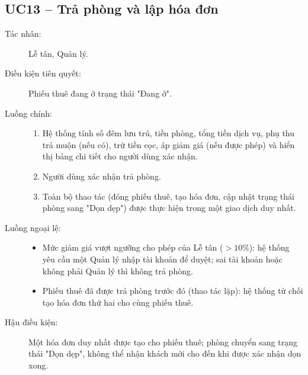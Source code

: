 \documentclass[14pt]{report}
\begin{document}
\subsection{UC13 -- Trả phòng và lập hóa đơn}
\begin{description}
  \item[Tác nhân:] Lễ tân, Quản lý.
  \item[Điều kiện tiên quyết:] Phiếu thuê đang ở trạng thái "Đang ở".
  \item[Luồng chính:]
  \begin{enumerate}
    \item Hệ thống tính số đêm lưu trú, tiền phòng, tổng tiền dịch vụ, phụ thu trả muộn (nếu có), trừ tiền cọc, áp giảm giá (nếu được phép) và hiển thị bảng chi tiết cho người dùng xác nhận.
    \item Người dùng xác nhận trả phòng.
    \item Toàn bộ thao tác (đóng phiếu thuê, tạo hóa đơn, cập nhật trạng thái phòng sang "Dọn dẹp") được thực hiện trong một giao dịch duy nhất.
  \end{enumerate}
  \item[Luồng ngoại lệ:]
  \begin{itemize}
    \item Mức giảm giá vượt ngưỡng cho phép của Lễ tân ($>10\%$): hệ thống yêu cầu một Quản lý nhập tài khoản để duyệt; sai tài khoản hoặc không phải Quản lý thì không trả phòng.
    \item Phiếu thuê đã được trả phòng trước đó (thao tác lặp): hệ thống từ chối tạo hóa đơn thứ hai cho cùng phiếu thuê.
  \end{itemize}
  \item[Hậu điều kiện:] Một hóa đơn duy nhất được tạo cho phiếu thuê; phòng chuyển sang trạng thái "Dọn dẹp", không thể nhận khách mới cho đến khi được xác nhận dọn xong.
\end{description}
\end{document}
